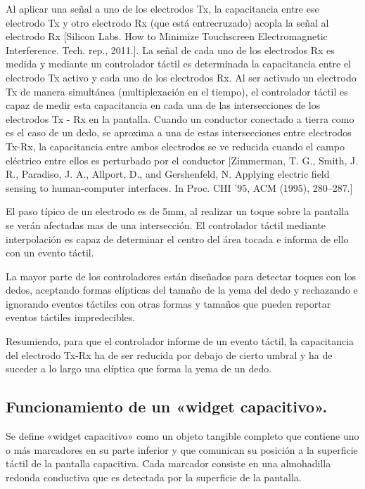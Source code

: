 Al aplicar una señal a uno de los electrodos Tx, la capacitancia entre ese electrodo Tx y otro electrodo Rx (que está entrecruzado) acopla la señal al electrodo Rx [Silicon Labs. How to Minimize Touchscreen Electromagnetic Interference. Tech. rep., 2011.]. La señal de cada uno de los electrodos Rx es medida y mediante un controlador táctil es determinada la capacitancia entre el electrodo Tx activo y cada uno de los electrodos Rx. Al ser activado un electrodo Tx de manera simultánea (multiplexación en el tiempo), el controlador táctil es capaz de medir esta capacitancia en cada una de las intersecciones de los electrodos Tx - Rx en la pantalla.
Cuando un conductor conectado a tierra como es el caso de un dedo, se aproxima a una de estas intersecciones entre electrodos Tx-Rx, la capacitancia entre ambos electrodos se ve reducida cuando el campo eléctrico entre ellos es perturbado por el conductor [Zimmerman, T. G., Smith, J. R., Paradiso, J. A., Allport, D., and Gershenfeld, N. Applying electric field sensing to human-computer interfaces. In Proc. CHI ’95, ACM (1995), 280–287.]

El paso típico de un electrodo es de 5mm, al realizar un toque sobre la pantalla se verán afectadas mas de una intersección. El controlador táctil mediante interpolación es capaz de determinar el centro del área tocada e informa de ello con un evento táctil.

La mayor parte de los controladores están diseñados para detectar toques con los dedos, aceptando formas elípticas del tamaño de la yema del dedo y rechazando e ignorando eventos táctiles con otras formas y tamaños que pueden reportar eventos táctiles impredecibles.

Resumiendo, para que el controlador informe de un evento táctil, la capacitancia del electrodo Tx-Rx ha de ser reducida por debajo de cierto umbral y ha de suceder a lo largo una elíptica que forma la yema de un dedo.


\subsection{Funcionamiento de un «widget capacitivo».}

Se define «widget capacitivo» como un objeto tangible completo que contiene uno o más marcadores en su parte inferior y que comunican su posición a la superficie táctil de la pantalla capacitiva. Cada marcador consiste en una almohadilla redonda conductiva que es detectada por la superficie de la pantalla.

